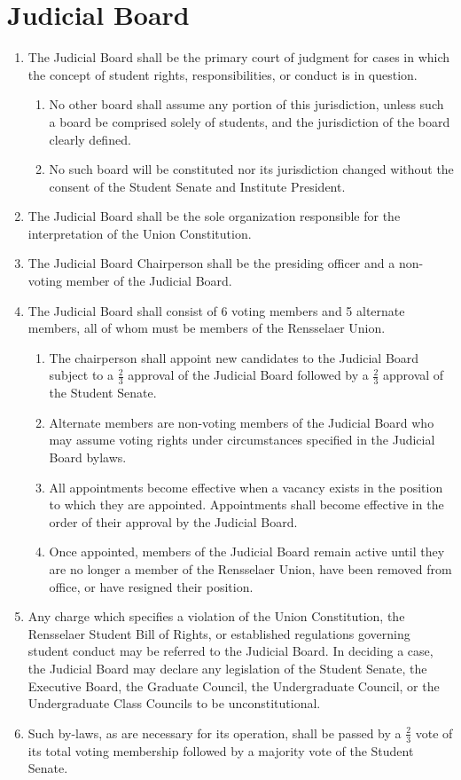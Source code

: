 \section{Judicial Board}
\begin{enumerate}
\item The Judicial Board shall be the primary court of judgment for cases in which the concept of student rights, responsibilities, or conduct is in question.
\begin{enumerate}
\item No other board shall assume any portion of this jurisdiction, unless such a board be comprised solely of students, and the jurisdiction of the board clearly defined.
\item No such board will be constituted nor its jurisdiction changed without the consent of the Student Senate and Institute President.
\end{enumerate}
\item The Judicial Board shall be the sole organization responsible for the interpretation of the Union Constitution.
\item The Judicial Board Chairperson shall be the presiding officer and a non-voting member of the
Judicial Board.
\item The Judicial Board shall consist of 6 voting members and 5 alternate members, all of whom must
be members of the Rensselaer Union.
\begin{enumerate}
\item The chairperson shall appoint new candidates to the Judicial Board subject to a $\frac{2}{3}$ approval of the Judicial Board followed by a $\frac{2}{3}$ approval of the Student Senate.
\item Alternate members are non-voting members of the Judicial Board who may assume voting rights under circumstances specified in the Judicial Board bylaws.
\item All appointments become effective when a vacancy exists in the position to which they are appointed. Appointments shall become effective in the order of their approval by the Judicial Board.
\item Once appointed, members of the Judicial Board remain active until they are no longer a member of the Rensselaer Union, have been removed from office, or have resigned their position.
\end{enumerate}
\item Any charge which specifies a violation of the Union Constitution, the Rensselaer Student Bill of
Rights, or established regulations governing student conduct may be referred to the Judicial
Board. In deciding a case, the Judicial Board may declare any legislation of the Student Senate,
the Executive Board, the Graduate Council, the Undergraduate Council, or the Undergraduate
Class Councils to be unconstitutional.
\item Such by-laws, as are necessary for its operation, shall be passed by a $\frac{2}{3}$ vote of its total voting
membership followed by a majority vote of the Student Senate.

\end{enumerate}

